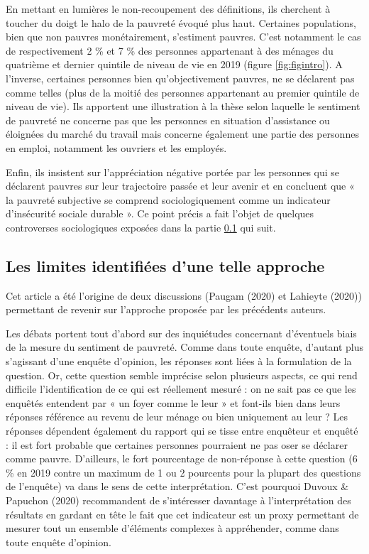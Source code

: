 \documentclass[12pt,a4paper]{reedthesis}
\begin{document}
En mettant en lumières le non-recoupement des définitions, ils cherchent à toucher du doigt le halo de la pauvreté évoqué plus haut. Certaines populations, bien que non pauvres monétairement, s'estiment pauvres. C'est notamment le cas de respectivement 2 \% et 7 \% des personnes appartenant à des ménages du quatrième et dernier quintile de niveau de vie en 2019 (figure \ref{fig:figintro}). A l'inverse, certaines personnes bien qu'objectivement pauvres, ne se déclarent pas comme telles (plus de la moitié des personnes appartenant au premier quintile de niveau de vie). Ils apportent une illustration à la thèse selon laquelle le sentiment de pauvreté ne concerne pas que les personnes en situation d'assistance ou éloignées du marché du travail mais concerne également une partie des personnes en emploi, notamment les ouvriers et les employés.

Enfin, ils insistent sur l'appréciation négative portée par les personnes qui se déclarent pauvres sur leur trajectoire passée et leur avenir et en concluent que « la pauvreté subjective se comprend sociologiquement comme un indicateur d'insécurité sociale durable ». Ce point précis a fait l'objet de quelques controverses sociologiques exposées dans la partie \ref{sec:limitesduvoux} qui suit.

\hypertarget{sec:limitesduvoux}{%
\subsection{Les limites identifiées d'une telle approche}\label{sec:limitesduvoux}}

Cet article a été l'origine de deux discussions (Paugam (2020) et Lahieyte (2020)) permettant de revenir sur l'approche proposée par les précédents auteurs.

Les débats portent tout d'abord sur des inquiétudes concernant d'éventuels biais de la mesure du sentiment de pauvreté. Comme dans toute enquête, d'autant plus s'agissant d'une enquête d'opinion, les réponses sont liées à la formulation de la question. Or, cette question semble imprécise selon plusieurs aspects, ce qui rend difficile l'identification de ce qui est réellement mesuré : on ne sait pas ce que les enquêtés entendent par « un foyer comme le leur » et font-ils bien dans leurs réponses référence au revenu de leur ménage ou bien uniquement au leur ? Les réponses dépendent également du rapport qui se tisse entre enquêteur et enquêté : il est fort probable que certaines personnes pourraient ne pas oser se déclarer comme pauvre. D'ailleurs, le fort pourcentage de non-réponse à cette question (6 \% en 2019 contre un maximum de 1 ou 2 pourcents pour la plupart des questions de l'enquête) va dans le sens de cette interprétation. C'est pourquoi Duvoux \& Papuchon (2020) recommandent de s'intéresser davantage à l'interprétation des résultats en gardant en tête le fait que cet indicateur est un proxy permettant de mesurer tout un ensemble d'éléments complexes à appréhender, comme dans toute enquête d'opinion.
\end{document}
